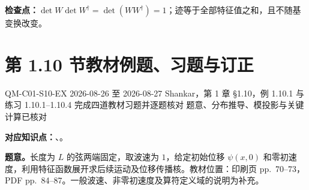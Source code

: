 \textbf{检查点：}$\det W\det W^\dagger=\det(WW^\dagger)=1$；迹等于全部特征值之和，且不随基变换改变。

\section{第 1.10 节教材例题、习题与订正}
\label{exercise-set:QM-C01-S10}

\exercisemeta
  {QM-C01-S10-EX}
  {2026-08-26 至 2026-08-27}
  {Shankar，第 1 章 \S 1.10，例 1.10.1 与练习 1.10.1--1.10.4}
  {完成四道教材习题并逐题核对}
  {题意、分布推导、模投影与关键计算已核对}


\textbf{对应知识点：}、。

\textbf{题意。}长度为 $L$ 的弦两端固定，取波速为 $1$，给定初始位移 $\psi(x,0)$ 和零初速度，利用特征函数展开求后续运动及位移传播核。教材位置：印刷页 pp.~70--73，PDF pp.~84--87。一般波速、非零初速度及算符定义域的说明为补充。


